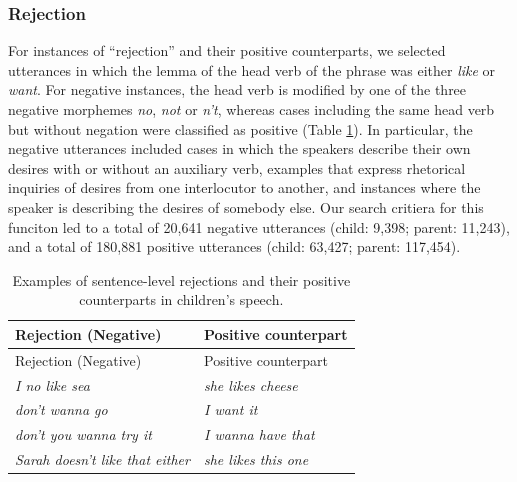 \documentclass[
  english,
  man,floatsintext]{apa6}
\begin{document}
\hypertarget{rejection}{%
\subsubsection{Rejection}\label{rejection}}

For instances of ``rejection'' and their positive counterparts, we selected utterances in which the lemma of the head verb of the phrase was either \emph{like} or \emph{want}. For negative instances, the head verb is modified by one of the three negative morphemes \emph{no}, \emph{not} or \emph{n't}, whereas cases including the same head verb but without negation were classified as positive (Table \ref{tab:rejection}). In particular, the negative utterances included cases in which the speakers describe their own desires with or without an auxiliary verb, examples that express rhetorical inquiries of desires from one interlocutor to another, and instances where the speaker is describing the desires of somebody else. Our search critiera for this funciton led to a total of 20,641 negative utterances (child: 9,398; parent: 11,243), and a total of 180,881 positive utterances (child: 63,427; parent: 117,454).

\begin{longtable}[]{@{}ll@{}}
\caption{\label{tab:rejection} Examples of sentence-level rejections and their positive counterparts in children's speech.}\tabularnewline
\toprule
Rejection (Negative) & Positive counterpart \\
\midrule
\endfirsthead
\toprule
Rejection (Negative) & Positive counterpart \\
\midrule
\endhead
\emph{I no like sea} & \emph{she likes cheese} \\
\emph{don't wanna go} & \emph{I want it} \\
\emph{don't you wanna try it} & \emph{I wanna have that} \\
\emph{Sarah doesn't like that either} & \emph{she likes this one} \\
\bottomrule
\end{longtable}
\end{document}
